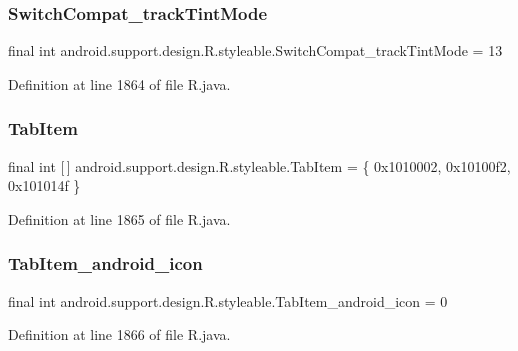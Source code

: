 \subsubsection{\texorpdfstring{SwitchCompat\_trackTintMode}{SwitchCompat\_trackTintMode}}
{\footnotesize\ttfamily final int android.\+support.\+design.\+R.\+styleable.\+Switch\+Compat\+\_\+track\+Tint\+Mode = 13\hspace{0.3cm}{\ttfamily [static]}}



Definition at line 1864 of file R.\+java.

\mbox{\label{classandroid_1_1support_1_1design_1_1_r_1_1styleable_a244f187ed8d4ed589f36e6db741d19e8}} 
\subsubsection{\texorpdfstring{TabItem}{TabItem}}
{\footnotesize\ttfamily final int \mbox{[}$\,$\mbox{]} android.\+support.\+design.\+R.\+styleable.\+Tab\+Item = \{ 0x1010002, 0x10100f2, 0x101014f \}\hspace{0.3cm}{\ttfamily [static]}}



Definition at line 1865 of file R.\+java.

\mbox{\label{classandroid_1_1support_1_1design_1_1_r_1_1styleable_a46e96d73ebab77295be1e1a6df14c775}} 
\subsubsection{\texorpdfstring{TabItem\_android\_icon}{TabItem\_android\_icon}}
{\footnotesize\ttfamily final int android.\+support.\+design.\+R.\+styleable.\+Tab\+Item\+\_\+android\+\_\+icon = 0\hspace{0.3cm}{\ttfamily [static]}}



Definition at line 1866 of file R.\+java.

